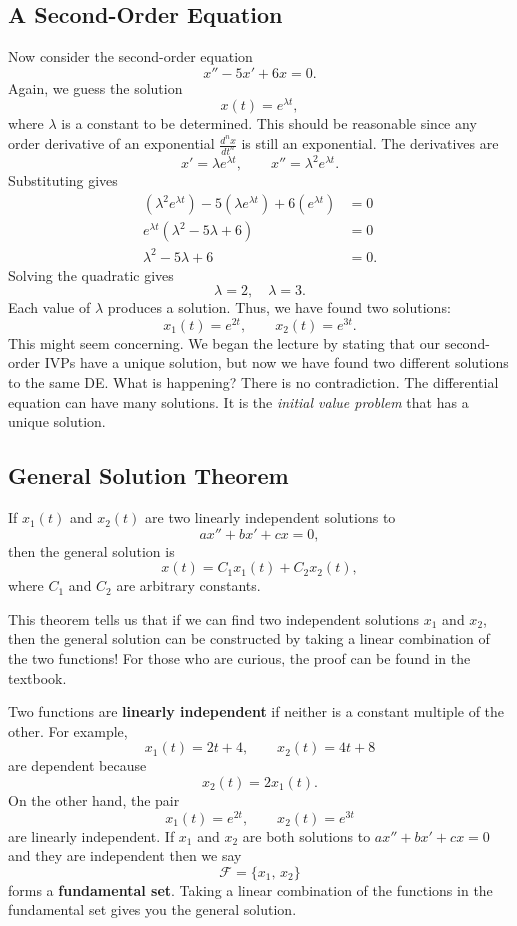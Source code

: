 \documentclass[10pt,letterpaper]{article}
\begin{document}
\subsection{A Second-Order Equation}
Now consider the second-order equation
\[
x'' - 5x' + 6x = 0.
\]
Again, we guess the solution
\[
x(t)=e^{\lambda t}, 
\]
where $\lambda$ is a constant to be determined. This should be reasonable since any order derivative of an exponential $\tfrac{d^nx}{dt^n}$ is still an exponential. The derivatives are
\[
x'=\lambda e^{\lambda t}, \qquad x''=\lambda^2 e^{\lambda t}.
\]
Substituting gives
\begin{align*}
(\lambda^2 e^{\lambda t}) - 5(\lambda e^{\lambda t}) + 6(e^{\lambda t})&=0\\
e^{\lambda t}(\lambda^2 - 5\lambda + 6)&=0\\
\lambda^2 - 5\lambda + 6 &= 0.
\end{align*}
Solving the quadratic gives
\[
\lambda=2, \quad \lambda=3.
\]
Each value of $\lambda$ produces a solution. Thus, we have found two
solutions:
\[
x_1(t)=e^{2t},
\qquad
x_2(t)=e^{3t}.
\]
This might seem concerning. We began the lecture by stating that our
second-order IVPs have a unique solution, but now we have found two
different solutions to the same DE. What is happening? There is no contradiction. The differential equation can have many
solutions. It is the \textit{initial value problem} that has a unique
solution.


\subsection{General Solution Theorem}

\begin{theorem}
If $x_1(t)$ and $x_2(t)$ are two linearly independent solutions to
\[
ax''+bx'+cx=0,
\]
then the general solution is
\[
x(t)=C_1x_1(t)+C_2x_2(t),
\]
where $C_1$ and $C_2$ are arbitrary constants.
\end{theorem}

This theorem tells us that if we can find two independent solutions $x_1$ and $x_2$, then the general solution can be constructed by taking a linear combination of the two functions! For those who are curious, the proof can be found in the textbook.

Two functions are \textbf{linearly independent} if neither is a constant multiple
of the other. For example,
\[
x_1(t)=2t+4,
\qquad
x_2(t)=4t+8
\]
are dependent because
\[
x_2(t)=2x_1(t).
\]
On the other hand, the pair
\[
x_1(t)=e^{2t},
\qquad
x_2(t)=e^{3t}
\]
are linearly independent. If $x_1$ and $x_2$ are both solutions to $ax''+bx'+cx=0$ and they are independent then we say
$$
\mathcal{F}=\{x_1,\,x_2\}
$$
forms a \textbf{fundamental set}. Taking a linear combination of the functions in the fundamental set gives you the  general solution. 
\end{document}
